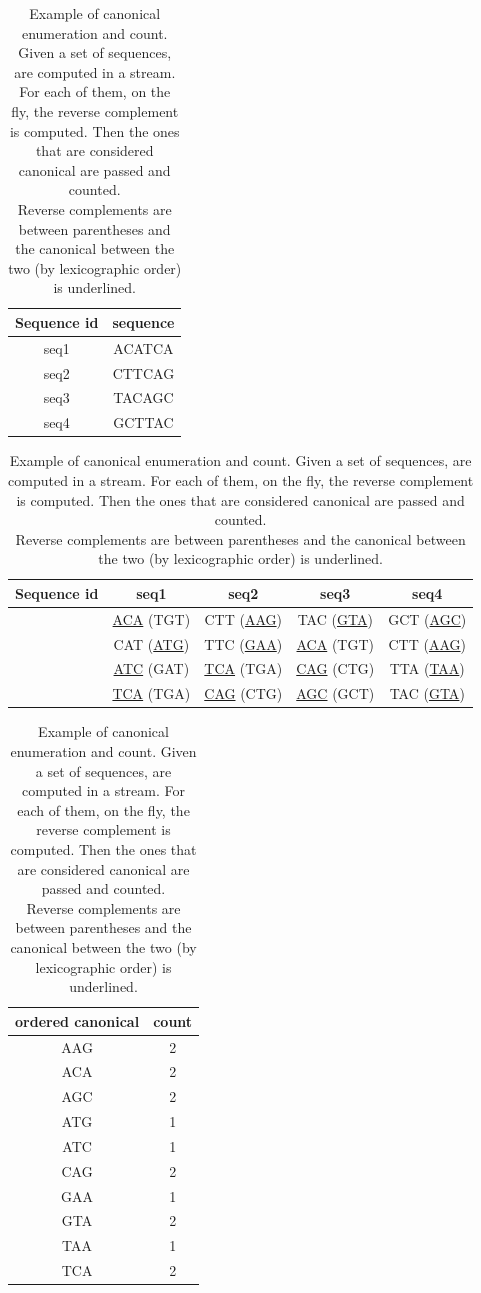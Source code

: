 \begin{table}
	\begin{center}
		\begin{tabular}{c | c}
			
			Sequence id & sequence \\
			\hline
			seq1 & ACATCA \\
			seq2 & CTTCAG \\
			seq3 & TACAGC \\
			seq4 & GCTTAC \\
			
		\end{tabular}
		\newline
		\vspace*{0.2 cm}
		\newline
		
		\begin{tabular}{c | c | c | c  | c}
			
			Sequence id & seq1 & seq2 & seq3 & seq4\\
			\hline
			\kmers  & \underline{ACA} (TGT) & CTT (\underline{AAG}) & TAC (\underline{GTA}) & GCT (\underline{AGC}) \\
			& CAT (\underline{ATG}) & TTC (\underline{GAA}) & \underline{ACA} (TGT) & CTT (\underline{AAG}) \\
			& \underline{ATC} (GAT) & \underline{TCA} (TGA) & \underline{CAG} (CTG) & TTA (\underline{TAA}) \\
			& \underline{TCA} (TGA) & \underline{CAG} (CTG) & \underline{AGC} (GCT) & TAC (\underline{GTA}) \\
		\end{tabular}
		\newline
		\vspace*{0.2 cm}
		\newline
		
		\begin{tabular}{c | c}
			
			ordered canonical \kmer & count\\
			\hline
			AAG & 2 \\
			ACA & 2 \\
			AGC & 2 \\
			ATG & 1 \\
			ATC & 1 \\
			CAG & 2 \\
			GAA & 1 \\
			GTA & 2 \\
			TAA & 1 \\
			TCA & 2 \\
		\end{tabular}
	\end{center}
	\caption[Example of canonical \kmer counting.]{Example of canonical \kmers enumeration and count. Given a set of sequences, \kmers are computed in a stream. For each of them, on the fly, the reverse complement is computed. Then the ones that are considered canonical are passed and counted.\\ Reverse complements are between parentheses and the canonical between the two (by lexicographic order) is underlined.}
	\label{tab-lista-kmer}
\end{table}

